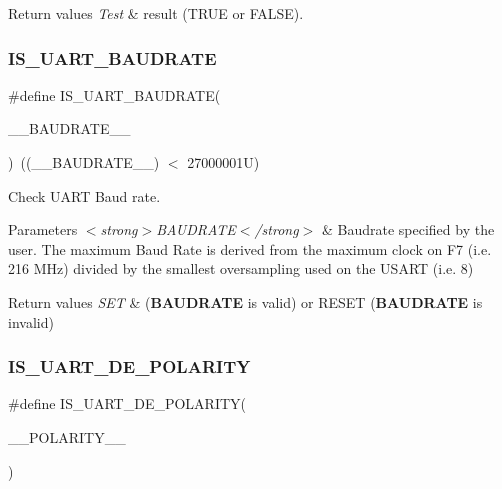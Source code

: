 \begin{DoxyRetVals}{Return values}
{\em Test} & result (T\+R\+UE or F\+A\+L\+SE). \\
\hline
\end{DoxyRetVals}
\mbox{\label{group___u_a_r_t___private___macros_gaa8f50c3cc4c04875ea490fb81a08731d}} 
\subsubsection{\texorpdfstring{IS\_UART\_BAUDRATE}{IS\_UART\_BAUDRATE}}
{\footnotesize\ttfamily \#define I\+S\+\_\+\+U\+A\+R\+T\+\_\+\+B\+A\+U\+D\+R\+A\+TE(\begin{DoxyParamCaption}\item[{}]{\+\_\+\+\_\+\+B\+A\+U\+D\+R\+A\+T\+E\+\_\+\+\_\+ }\end{DoxyParamCaption})~((\+\_\+\+\_\+\+B\+A\+U\+D\+R\+A\+T\+E\+\_\+\+\_\+) $<$ 27000001\+U)}



Check U\+A\+RT Baud rate. 


\begin{DoxyParams}{Parameters}
{\em $<$strong$>$\+B\+A\+U\+D\+R\+A\+T\+E$<$/strong$>$} & Baudrate specified by the user. The maximum Baud Rate is derived from the maximum clock on F7 (i.\+e. 216 M\+Hz) divided by the smallest oversampling used on the U\+S\+A\+RT (i.\+e. 8) \\
\hline
\end{DoxyParams}

\begin{DoxyRetVals}{Return values}
{\em S\+ET} & ({\bfseries{B\+A\+U\+D\+R\+A\+TE}} is valid) or R\+E\+S\+ET ({\bfseries{B\+A\+U\+D\+R\+A\+TE}} is invalid) \\
\hline
\end{DoxyRetVals}
\mbox{\label{group___u_a_r_t___private___macros_gaecf169f01673ae67b12b3155e074bf12}} 
\subsubsection{\texorpdfstring{IS\_UART\_DE\_POLARITY}{IS\_UART\_DE\_POLARITY}}
{\footnotesize\ttfamily \#define I\+S\+\_\+\+U\+A\+R\+T\+\_\+\+D\+E\+\_\+\+P\+O\+L\+A\+R\+I\+TY(\begin{DoxyParamCaption}\item[{}]{\+\_\+\+\_\+\+P\+O\+L\+A\+R\+I\+T\+Y\+\_\+\+\_\+ }\end{DoxyParamCaption})}

